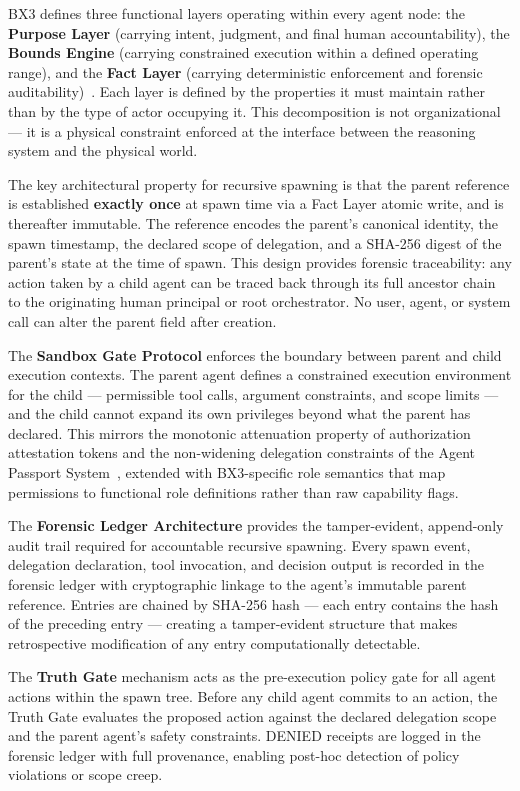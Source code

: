 BX3 defines three functional layers operating within every agent node: the \textbf{Purpose Layer} (carrying intent, judgment, and final human accountability), the \textbf{Bounds Engine} (carrying constrained execution within a defined operating range), and the \textbf{Fact Layer} (carrying deterministic enforcement and forensic auditability)~\cite{bx3framework2026}. Each layer is defined by the properties it must maintain rather than by the type of actor occupying it. This decomposition is not organizational — it is a physical constraint enforced at the interface between the reasoning system and the physical world.

The key architectural property for recursive spawning is that the parent reference is established \textbf{exactly once} at spawn time via a Fact Layer atomic write, and is thereafter immutable. The reference encodes the parent's canonical identity, the spawn timestamp, the declared scope of delegation, and a SHA-256 digest of the parent's state at the time of spawn. This design provides forensic traceability: any action taken by a child agent can be traced back through its full ancestor chain to the originating human principal or root orchestrator. No user, agent, or system call can alter the parent field after creation.

The \textbf{Sandbox Gate Protocol} enforces the boundary between parent and child execution contexts. The parent agent defines a constrained execution environment for the child — permissible tool calls, argument constraints, and scope limits — and the child cannot expand its own privileges beyond what the parent has declared. This mirrors the monotonic attenuation property of authorization attestation tokens and the non-widening delegation constraints of the Agent Passport System~\cite{sovereignagent}, extended with BX3-specific role semantics that map permissions to functional role definitions rather than raw capability flags.

The \textbf{Forensic Ledger Architecture} provides the tamper-evident, append-only audit trail required for accountable recursive spawning. Every spawn event, delegation declaration, tool invocation, and decision output is recorded in the forensic ledger with cryptographic linkage to the agent's immutable parent reference. Entries are chained by SHA-256 hash — each entry contains the hash of the preceding entry — creating a tamper-evident structure that makes retrospective modification of any entry computationally detectable.

The \textbf{Truth Gate} mechanism acts as the pre-execution policy gate for all agent actions within the spawn tree. Before any child agent commits to an action, the Truth Gate evaluates the proposed action against the declared delegation scope and the parent agent's safety constraints. DENIED receipts are logged in the forensic ledger with full provenance, enabling post-hoc detection of policy violations or scope creep.

